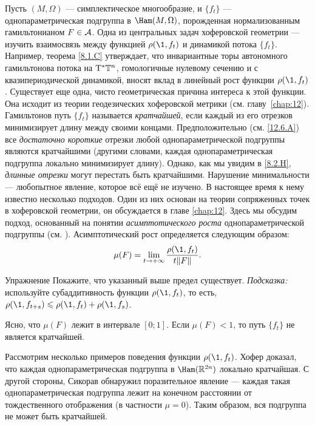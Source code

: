 Пусть $(M, \Omega)$ — симплектическое многообразие, и $\{f_t\}$ —
однопараметрическая подгруппа в $\Ham (M, \Omega)$, порожденная
нормализованным гамильтонианом $F \in \mathcal{A}$. 
Одна из центральных задач хоферовской геометрии — изучить
взаимосвязь между функцией $\rho (\1, f_t)$ и динамикой потока
$\{f_t\}$.
Например, теорема \ref{8.1.C} утверждает, что инвариантные торы
автономного гамильтонова потока на $\mathrm{T}^\ast \mathbb{T}^n$,  гомологичные
нулевому сечению и с квазипериодической динамикой, вносят вклад в
линейный рост функции $\rho (\1, f_t)$. 
Существует еще одна, чисто геометрическая причина интереса к этой функции.
Она исходит из теории геодезических хоферовской метрики (см. главу~\ref{chap:12}). 
Гамильтонов путь $\{f_t\}$ называется
\emph{кратчайшей}, если каждый из его отрезков
минимизирует длину между своими концами.
Предположительно (см. \ref{12.6.A}) все {}\emph{достаточно короткие}
отрезки любой однопараметрической подгруппы являются кратчайшими
(другими словами, каждая однопараметрическая подгруппа локально
минимизирует длину). 
Однако, как мы увидим в \ref{8.2.H}, {}\emph{длинные отрезки} могут перестать
быть кратчайшими. 
Нарушение минимальности — любопытное явление, которое всё ещё не изучено.
В настоящее время к нему известно несколько подходов.
Один из них основан на теории сопряженных точек в хоферовской
геометрии, он обсуждается в главе \ref{chap:12}. 
Здесь мы обсудим подход, основанный на понятии \emph{асимптотического роста}
однопараметрической подгруппы (см. \cite{BP2}). 
Асимптотический рост определяется следующим образом: 
\[\mu(F)=\lim_{t \to + \infty}\frac{\rho (\1, f_t)}{ t \| F \|}.\]

\begin{ex*}{Упражнение}
Покажите, что указанный выше предел существует.
\emph{Подсказка:} используйте субаддитивность функции $\rho (\1, f_t)$, то есть, $\rho (\1, f_{t + s}) \le \rho (\1, f_t) + \rho (\1, f_s)$. 
\end{ex*}

Ясно, что $\mu (F)$ лежит в интервале $[0; 1]$.
Если $\mu (F) <1$, то путь $\{f_t\}$ не является кратчайшей.

Рассмотрим несколько примеров поведения функции $\rho (\1, f_t)$.
Хофер \cite{H2} доказал, что каждая однопараметрическая подгруппа в
$\Ham (\RR^{2n})$ локально кратчайшая. 
С другой стороны, Сикорав \cite{S2} обнаружил поразительное явление --- каждая такая однопараметрическая подгруппа лежит на конечном расстоянии от тождественного отображения (в частности $\mu=0$).
Таким образом, вся подгруппа не может быть кратчайшей. 

